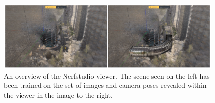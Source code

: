 \begin{figure}[H]
    \centering
    \includegraphics[width=1.0\textwidth]{figures/nerfstudio-viewer-overview.png}
    \caption[An overview of the Nerfstudio viewer.]{An overview of the Nerfstudio viewer. The scene seen on the left has been trained on the set of images and camera poses revealed within the viewer in the image to the right.}
    \label{fig:nerfstudio-viewer-overview}
\end{figure}